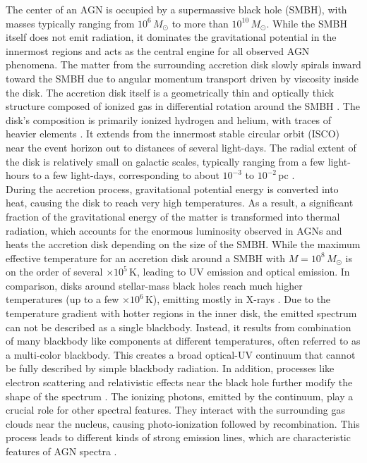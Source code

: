 The center of an AGN is occupied by a supermassive black hole (SMBH), with masses typically ranging from $10^6\,M_\odot$ to more than $10^{10}\,M_\odot$. While the SMBH itself does not emit radiation, it dominates the gravitational potential in the innermost regions and acts as the central engine for all observed AGN phenomena. The matter from the surrounding accretion disk slowly spirals inward toward the SMBH due to angular momentum transport driven by viscosity inside the disk. The accretion disk itself is a geometrically thin and optically thick structure composed of ionized gas in differential rotation around the SMBH \parencite{shakura1973black}. The disk's composition is primarily ionized hydrogen and helium, with traces of heavier elements \parencite{netzer2013agn}. It extends from the innermost stable circular orbit (ISCO) near the event horizon out to distances of several light-days. The radial extent of the disk is relatively small on galactic scales, typically ranging from a few light-hours to a few light-days, corresponding to about $10^{-3}$ to $10^{-2}$\,pc \parencite{netzer2013agn,hickox2018obscured}.  \\
During the accretion process, gravitational potential energy is converted into heat, causing the disk to reach very high temperatures. As a result, a significant fraction of the gravitational energy of the matter is transformed into thermal radiation, which accounts for the enormous luminosity observed in AGNs and heats the accretion disk depending on the size of the SMBH. While the maximum effective temperature for an accretion disk around a SMBH with $M = 10^8\,M_\odot$ is on the order of several $\times 10^5$\,K, leading to UV emission and optical emission. In comparison, disks around stellar-mass black holes reach much higher temperatures (up to a few $\times 10^6$\,K), emitting mostly in X-rays \parencite{netzer2013agn}. Due to the temperature gradient with hotter regions in the inner disk, the emitted spectrum can not be described as a single blackbody. Instead, it results from combination of many blackbody like components at different temperatures, often referred to as a multi-color blackbody. This creates a broad optical-UV continuum that cannot be fully described by simple blackbody radiation. In addition, processes like electron scattering and relativistic effects near the black hole further modify the shape of the spectrum \parencite{netzer2013agn}.
The ionizing photons, emitted by the continuum, play a crucial role for other spectral features. They interact with the surrounding gas clouds near the nucleus, causing photo-ionization followed by recombination. This process leads to different kinds of strong emission lines, which are characteristic features of AGN spectra \parencite{osterbrock1989agn}.



